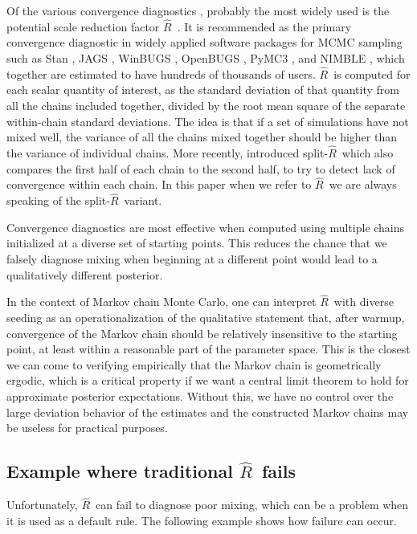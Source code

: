 \documentclass[american,]{article}
\newcommand{\Rhat}{$\widehat{R}$}
\newcommand{\sRhat}{split-$\widehat{R}$}
\theoremstyle{definition}
\begin{document}
Of the various convergence diagnostics \citep[see reviews by][]{Cowles+Carlin:1996,Mengersen+etal:1999,Robert+Casella:2004}, 
probably the most widely used  
is the potential scale reduction factor \Rhat\
\citep{Gelman+Rubin:1992, Brooks+Gelman:1998}.
It is recommended as the primary convergence diagnostic in widely applied
software packages for MCMC sampling such as Stan \citep{Stan:JSS:2017}, 
JAGS \citep{plummer2003jags}, WinBUGS \citep{WinBUGS:2000}, OpenBUGS \citep{BUGSproject:2009}, PyMC3 \citep{pymc3}, 
and NIMBLE \citep{nimble}, which together are estimated to have hundreds of thousands of users. 
\Rhat\ is computed for each scalar quantity of interest, as the standard deviation of that quantity from all the chains included together, divided by the root mean square of the separate within-chain standard deviations.
The idea is that if a set of simulations have not mixed well, the variance of
all the chains mixed together should be higher than the variance of individual chains.
More recently, \cite{BDA3} introduced \sRhat\ which also compares 
the first half of each chain to the second
half, to try to detect lack of convergence within each chain.  In this
paper when we refer to \Rhat\ we are always speaking of the \sRhat\ variant.

Convergence diagnostics are most effective when computed using multiple chains initialized at a 
diverse set of starting points. This reduces the chance that we falsely diagnose
mixing when beginning at a different point would lead to a 
qualitatively different posterior.

In the context of Markov chain Monte Carlo, one can interpret \Rhat\ 
with diverse seeding as an operationalization of the qualitative statement 
that, after warmup, convergence of the Markov chain should be relatively insensitive to the starting 
point, at least within a 
reasonable part of the parameter space. This is the closest we can come to 
verifying empirically that the Markov chain is geometrically ergodic, which is a critical 
property if we want  a central limit theorem to hold for approximate
posterior expectations. Without this, we have no control over the large
deviation behavior of the estimates and the constructed Markov chains may
be useless for practical purposes.

\subsection{Example where traditional \Rhat\ fails}

Unfortunately, \Rhat\ can fail to diagnose poor mixing, which can be a problem when it is used as a default rule. The following example shows how
failure can occur.
\end{document}
